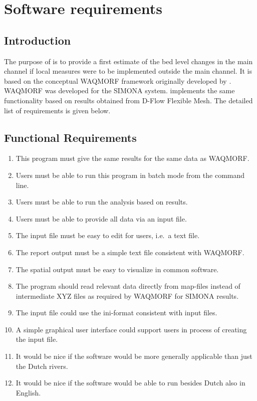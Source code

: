 \chapter{Software requirements}

\section{Introduction}

The purpose of \dfastmi is to provide a first estimate of the bed level changes in the main channel if local measures were to be implemented outside the main channel.
It is based on the conceptual WAQMORF framework originally developed by \citet{Sieben2008}.
WAQMORF was developed for the SIMONA system.
\dfastmi implements the same functionality based on results obtained from D-Flow Flexible Mesh.
The detailed list of requirements is given below.

\section{Functional Requirements}

\begin{enumerate}
\item This program must give the same results for the same data as WAQMORF.
\item Users must be able to run this program in batch mode from the command line.
\item Users must be able to run the analysis based on \dflowfm results.
\item Users must be able to provide all data via an input file.
\item The input file must be easy to edit for users, i.e.~a text file.
\item The report output must be a simple text file consistent with WAQMORF.
\item The spatial output must be easy to visualize in common software.

\item The program should read relevant data directly from \dflowfm map-files instead of intermediate XYZ files as required by WAQMORF for SIMONA results.

\item The input file could use the ini-format consistent with \dflowfm input files.
\item A simple graphical user interface could support users in process of creating the input file.

\item It would be nice if the software would be more generally applicable than just the Dutch rivers.
\item It would be nice if the software would be able to run besides Dutch also in English.
\end{enumerate}

